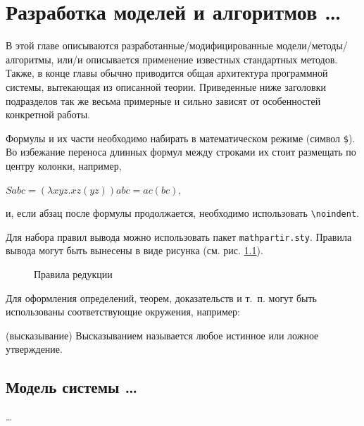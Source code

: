  \chapter{Разработка моделей и алгоритмов \dots}

В этой главе описываются разработанные/модифицированные модели/методы/
алгоритмы, или/и описывается применение известных стандартных методов. Также, 
в конце главы обычно приводится общая архитектура программной системы, 
вытекающая из описанной теории. Приведенные ниже заголовки подразделов так же 
весьма примерные и сильно зависят от особенностей конкретной работы.

Формулы и их части необходимо набирать в математическом режиме
(символ \verb|$|). Во избежание переноса длинных формул между строками их 
стоит размещать по центру колонки, например,
\begin{center}
$S a b c = (\lambda x y z. x z (y z)) a b c = a c (b c)$,
\end{center}
\noindent и, если абзац после формулы продолжается, необходимо использовать 
\verb|\noindent|.

Для набора правил вывода можно использовать пакет \texttt{mathpartir.sty}. 
Правила вывода могут быть вынесены в виде рисунка (см. рис. 
\ref{img:inferrules}).

\begin{figure}[t]
  \centering
  \caption{Правила редукции}
  \label{img:inferrules}
\end{figure}

Для оформления определений, теорем, доказательств и т.~п. могут быть 
использованы соответствующие окружения, например:

\begin{definition}
(высказывание)
Высказыванием называется любое истинное или ложное утверждение.
\end{definition}


\section{Модель системы \dots}

\dots




